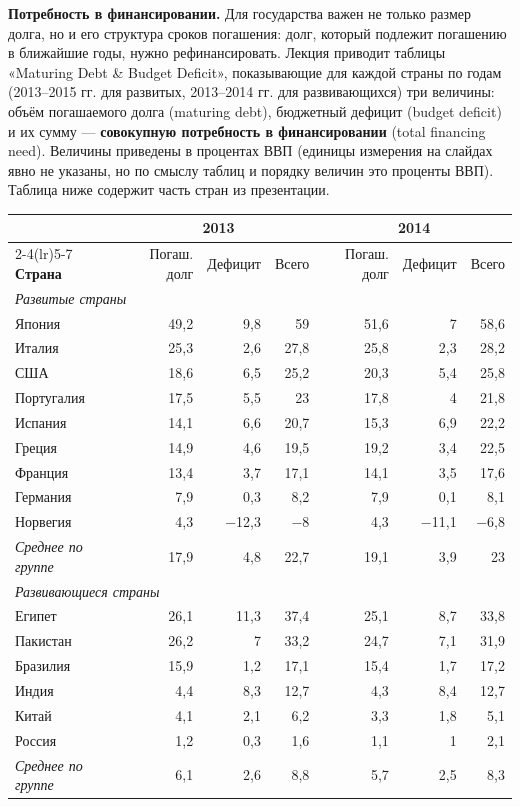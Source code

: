 \documentclass[11pt,a4paper]{article}
\begin{document}
\textbf{Потребность в финансировании.} Для государства важен не только размер долга, но и его структура сроков погашения: долг, который подлежит погашению в ближайшие годы, нужно рефинансировать. Лекция приводит таблицы «Maturing Debt \& Budget Deficit», показывающие для каждой страны по годам (2013--2015 гг. для развитых, 2013--2014 гг. для развивающихся) три величины: объём погашаемого долга (maturing debt), бюджетный дефицит (budget deficit) и их сумму --- \textbf{совокупную потребность в финансировании} (total financing need). Величины приведены в процентах ВВП (единицы измерения на слайдах явно не указаны, но по смыслу таблиц и порядку величин это проценты ВВП). Таблица ниже содержит часть стран из презентации.

\begin{center}
\footnotesize
\setlength{\tabcolsep}{3.5pt}
\begin{tabular}{lrrrrrr}
\toprule
 & \multicolumn{3}{c}{\textbf{2013}} & \multicolumn{3}{c}{\textbf{2014}}\\
\cmidrule(lr){2-4}\cmidrule(lr){5-7}
\textbf{Страна} & Погаш. долг & Дефицит & Всего & Погаш. долг & Дефицит & Всего\\
\midrule
\multicolumn{7}{l}{\textit{Развитые страны}}\\
Япония & 49,2 & 9,8 & 59 & 51,6 & 7 & 58,6\\
Италия & 25,3 & 2,6 & 27,8 & 25,8 & 2,3 & 28,2\\
США & 18,6 & 6,5 & 25,2 & 20,3 & 5,4 & 25,8\\
Португалия & 17,5 & 5,5 & 23 & 17,8 & 4 & 21,8\\
Испания & 14,1 & 6,6 & 20,7 & 15,3 & 6,9 & 22,2\\
Греция & 14,9 & 4,6 & 19,5 & 19,2 & 3,4 & 22,5\\
Франция & 13,4 & 3,7 & 17,1 & 14,1 & 3,5 & 17,6\\
Германия & 7,9 & 0,3 & 8,2 & 7,9 & 0,1 & 8,1\\
Норвегия & 4,3 & −12,3 & −8 & 4,3 & −11,1 & −6,8\\
\textit{Среднее по группе} & 17,9 & 4,8 & 22,7 & 19,1 & 3,9 & 23\\
\midrule
\multicolumn{7}{l}{\textit{Развивающиеся страны}}\\
Египет & 26,1 & 11,3 & 37,4 & 25,1 & 8,7 & 33,8\\
Пакистан & 26,2 & 7 & 33,2 & 24,7 & 7,1 & 31,9\\
Бразилия & 15,9 & 1,2 & 17,1 & 15,4 & 1,7 & 17,2\\
Индия & 4,4 & 8,3 & 12,7 & 4,3 & 8,4 & 12,7\\
Китай & 4,1 & 2,1 & 6,2 & 3,3 & 1,8 & 5,1\\
Россия & 1,2 & 0,3 & 1,6 & 1,1 & 1 & 2,1\\
\textit{Среднее по группе} & 6,1 & 2,6 & 8,8 & 5,7 & 2,5 & 8,3\\
\bottomrule
\end{tabular}
\end{center}
\end{document}
